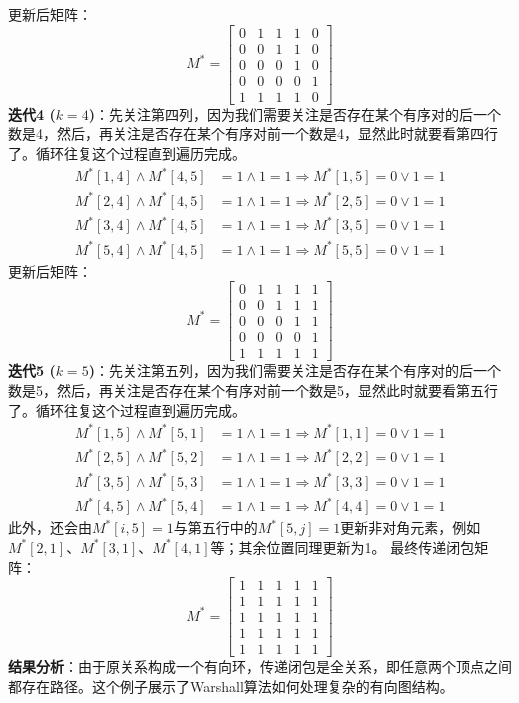 \documentclass[lang=cn,11pt]{elegantbook}
\begin{document}
更新后矩阵：
\[
M^* = \begin{bmatrix}
0 & 1 & 1 & 1 & 0 \\
0 & 0 & 1 & 1 & 0 \\
0 & 0 & 0 & 1 & 0 \\
0 & 0 & 0 & 0 & 1 \\
1 & 1 & 1 & 1 & 0
\end{bmatrix}
\]
\textbf{迭代4 ($k=4$)}：先关注第四列，因为我们需要关注是否存在某个有序对的后一个数是4，然后，再关注是否存在某个有序对前一个数是4，显然此时就要看第四行了。循环往复这个过程直到遍历完成。
\begin{align*}
M^*[1,4] \land M^*[4,5] &= 1 \land 1 = 1 \Rightarrow M^*[1,5] = 0 \lor 1 = 1 \\
M^*[2,4] \land M^*[4,5] &= 1 \land 1 = 1 \Rightarrow M^*[2,5] = 0 \lor 1 = 1 \\
M^*[3,4] \land M^*[4,5] &= 1 \land 1 = 1 \Rightarrow M^*[3,5] = 0 \lor 1 = 1 \\
M^*[5,4] \land M^*[4,5] &= 1 \land 1 = 1 \Rightarrow M^*[5,5] = 0 \lor 1 = 1
\end{align*}
更新后矩阵：
\[
M^* = \begin{bmatrix}
0 & 1 & 1 & 1 & 1 \\
0 & 0 & 1 & 1 & 1 \\
0 & 0 & 0 & 1 & 1 \\
0 & 0 & 0 & 0 & 1 \\
1 & 1 & 1 & 1 & 1
\end{bmatrix}
\]
\textbf{迭代5 ($k=5$)}：先关注第五列，因为我们需要关注是否存在某个有序对的后一个数是5，然后，再关注是否存在某个有序对前一个数是5，显然此时就要看第五行了。循环往复这个过程直到遍历完成。
\begin{align*}
M^*[1,5] \land M^*[5,1] &= 1 \land 1 = 1 \Rightarrow M^*[1,1] = 0 \lor 1 = 1 \\
M^*[2,5] \land M^*[5,2] &= 1 \land 1 = 1 \Rightarrow M^*[2,2] = 0 \lor 1 = 1 \\
M^*[3,5] \land M^*[5,3] &= 1 \land 1 = 1 \Rightarrow M^*[3,3] = 0 \lor 1 = 1 \\
M^*[4,5] \land M^*[5,4] &= 1 \land 1 = 1 \Rightarrow M^*[4,4] = 0 \lor 1 = 1
\end{align*}
此外，还会由$M^*[i,5]=1$与第五行中的$M^*[5,j]=1$更新非对角元素，例如$M^*[2,1]$、$M^*[3,1]$、$M^*[4,1]$等；其余位置同理更新为1。
最终传递闭包矩阵：
\[
M^* = \begin{bmatrix}
1 & 1 & 1 & 1 & 1 \\
1 & 1 & 1 & 1 & 1 \\
1 & 1 & 1 & 1 & 1 \\
1 & 1 & 1 & 1 & 1 \\
1 & 1 & 1 & 1 & 1
\end{bmatrix}
\]
\textbf{结果分析}：由于原关系构成一个有向环，传递闭包是全关系，即任意两个顶点之间都存在路径。这个例子展示了Warshall算法如何处理复杂的有向图结构。
\end{document}
